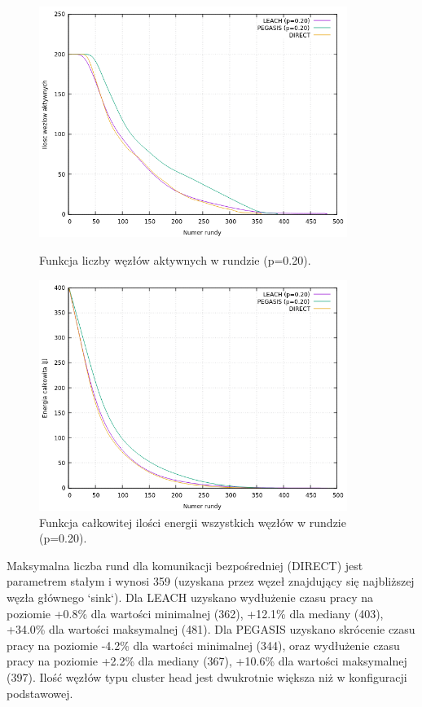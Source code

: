 \documentclass[a4paper,12pt,twoside,openany]{report}
\begin{document}
\begin{figure}[H]
 \centering
 \includegraphics[width=10cm]{images/gnuplot/test_4/nodes_in_round_p020.png}
 \caption{Funkcja liczby węzłów aktywnych w rundzie (p=0.20).}
 \includegraphics[width=10cm]{images/gnuplot/test_4/energy_in_round_p020.png}
 \caption{Funkcja całkowitej ilości energii wszystkich węzłów w rundzie (p=0.20).}
\end{figure}

\par
Maksymalna liczba rund dla komunikacji bezpośredniej (DIRECT) jest parametrem stałym i wynosi 359 (uzyskana przez węzeł znajdujący się najbliższej węzła głównego `sink`).
Dla LEACH uzyskano wydłużenie czasu pracy na poziomie +0.8\% dla wartości minimalnej (362), +12.1\% dla mediany (403), +34.0\% dla wartości maksymalnej (481).
Dla PEGASIS uzyskano skrócenie czasu pracy na poziomie -4.2\% dla wartości minimalnej (344), oraz wydłużenie czasu pracy na poziomie +2.2\% dla mediany (367), +10.6\% dla wartości maksymalnej (397).
Ilość węzłów typu cluster head jest dwukrotnie większa niż w konfiguracji podstawowej.
\end{document}
